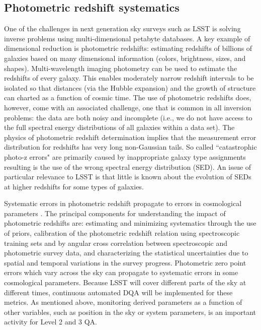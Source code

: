 \documentclass[SE,toc]{lsstdoc}
\begin{document}
\subsection{Photometric redshift systematics}

One of the challenges in next generation sky surveys such as LSST is solving inverse problems using multi-dimensional petabyte databases. A key example of dimensional reduction is photometric redshifts: estimating redshifts of billions of galaxies based on many dimensional information (colors, brightness, sizes, and shapes). Multi-wavelength imaging photometry can be used to estimate the redshifts of every galaxy.  This enables moderately narrow redshift intervals to be isolated so that distances (via the Hubble expansion) and the growth of structure can charted as a function of cosmic time.  The use of photometric redshifts does, however, come with an associated challenge, one that is common in all inversion problems: the data are both noisy and incomplete (i.e., we do not have access to the full spectral energy distributions of all galaxies within a data set). The physics of photometric redshift determination implies that the measurement error distribution for redshifts has very long non-Gaussian tails. So called ``catastrophic photo-z errors" are primarily caused by inappropriate galaxy type assignments resulting is the use of the wrong spectral energy distribution (SED). An issue of particular relevance to LSST is that little is known about the evolution of SEDs at higher redshifts for some types of galaxies.

Systematic errors in photometric redshift propagate to errors in cosmological parameters \citep{2011ApJ...734...36A}. The principal components for understanding the impact of photometric redshifts are: estimating and minimizing systematics through the use of priors, calibration of the photometric redshift relation using spectroscopic training sets and by angular cross correlation between spectroscopic and photometric survey data, and characterizing the statistical uncertainties due to spatial and temporal variations in the survey progress.  Photometric zero point errors \citep{2010SPIE.7737E..1FJ} which vary across the sky can propagate to systematic errors in some cosmological parameters. Because LSST will cover different parts of the sky at different times, continuous automated DQA will be implemented for these metrics. As mentioned above, monitoring derived parameters as a function of other variables, such as position in the sky or system parameters, is an important activity for Level 2 and 3 QA.
\end{document}
